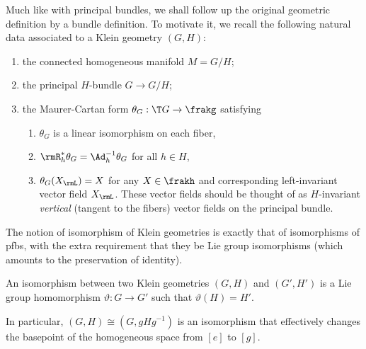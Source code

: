 Much like with principal bundles, we shall follow up the original geometric definition by a bundle definition. To motivate it, we recall the following natural data associated to a Klein geometry $(G,H)$:
\begin{enumerate}[label=(\alph*)]
    \item the connected homogeneous manifold $M=G\slash H$;
    \item the principal $H$-bundle $G\to G\slash H$;
    \item the Maurer-Cartan form $\theta_G:\T G\to \frakg$ satisfying
    \begin{enumerate}[label=(\roman*)]
        \item $\theta_G$ is a linear isomorphism on each fiber,
        \item $\rmR_h^\ast \theta_G=\Ad_h^{-1}\theta_G$ for all $h\in H$,
        \item $\theta_G(X_\rmL)=X$ for any $X\in \frakh$ and corresponding left-invariant vector field $X_\rmL$. These vector fields should be thought of as $H$-invariant \emph{vertical} (tangent to the fibers) vector fields on the principal bundle.
    \end{enumerate}
\end{enumerate}

The notion of isomorphism of Klein geometries is exactly that of isomorphisms of \glspl{pfb}, with the extra requirement that they be Lie group isomorphisms (which amounts to the preservation of identity).



\begin{defn}
    An isomorphism between two Klein geometries $(G,H)$ and $(G',H')$ is a Lie group homomorphism $\vartheta:G\to G'$ such that $\vartheta(H)=H'$.
\end{defn}

In particular, $(G,H)\cong (G,gHg^{-1})$ is an isomorphism that effectively changes the basepoint of the homogeneous space from $[e]$ to $[g]$.

